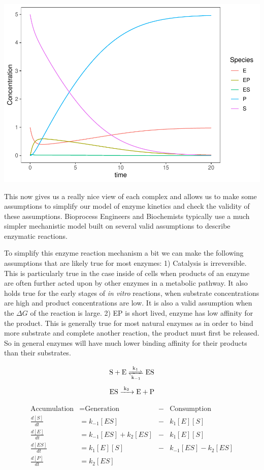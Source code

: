 \documentclass[
]{article}
\begin{document}
\includegraphics{Bioprocess_Engineering_files/figure-latex/unnamed-chunk-21-1.pdf}

This now gives us a really nice view of each complex and allows us to make some assumptions to simplify our model of enzyme kinetics and check the validity of these assumptions. Bioprocess Engineers and Biochemists typically use a much simpler mechanistic model built on several valid assumptions to describe enzymatic reactions.

To simplify this enzyme reaction mechanism a bit we can make the following assumptions that are likely true for most enzymes:
1) Catalysis is irreversible. This is particularly true in the case inside of cells when products of an enzyme are often further acted upon by other enzymes in a metabolic pathway. It also holds true for the early stages of \emph{in vitro} reactions, when substrate concentrations are high and product concentrations are low. It is also a valid assumption when the \(\Delta G\) of the reaction is large.
2) EP is short lived, enzyme has low affinity for the product. This is generally true for most natural enzymes as in order to bind more substrate and complete another reaction, the product must first be released. So in general enzymes will have much lower binding affinity for their products than their substrates.

\[\ce{S + E <=>[k_1][k_{-1}] ES}\]
\[\ce{ES ->[k_2] E + P}\]

\[\begin{aligned}
  \text{Accumulation} &= \text{Generation} &-& \text{Consumption}
  \\
  \frac{d[S]}{dt} &= k_{-1}[ES] &-& k_{1}[E][S] 
  \\
  \frac{d[E]}{dt} &= k_{-1}[ES] + k_2[ES] &-& k_{1}[E][S]
  \\
  \frac{d[ES]}{dt} &= k_{1}[E][S] &-& k_{-1}[ES] - k_{2}[ES] 
  \\  
  \frac{d[P]}{dt} &= k_{2}[ES]  
\end{aligned}\]
\end{document}
